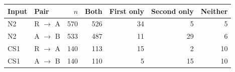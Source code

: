 \begin{tabular}{llrrrrr}
\toprule
Input & Pair & $n$ & Both & First only & Second only & Neither \\
\midrule
N2 & R $\to$ A & 570 & 526 & 34 & 5 & 5 \\
N2 & A $\to$ B & 533 & 487 & 11 & 29 & 6 \\
CS1 & R $\to$ A & 140 & 113 & 15 & 2 & 10 \\
CS1 & A $\to$ B & 140 & 110 & 5 & 15 & 10 \\
\bottomrule
\end{tabular}
